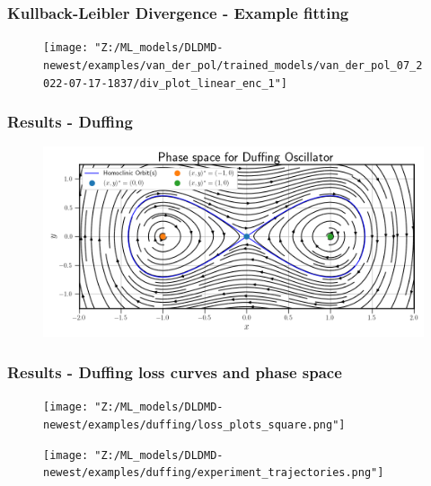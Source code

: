 \documentclass[11pt,aspectratio=169]{beamer}
\begin{document}
    \begin{frame}
        \frametitle{Kullback-Leibler Divergence - Example fitting}
        \begin{figure}
            \centering
            \texttt{[image: "Z:/ML\_models/DLDMD-newest/examples/van\_der\_pol/trained\_models/van\_der\_pol\_07\_2022-07-17-1837/div\_plot\_linear\_enc\_1"]}
        \end{figure}
    \end{frame}

    \begin{frame}
        \frametitle{Results - Duffing}
        \begin{figure}
            \centering
            \includegraphics[width=\textwidth]{../Figures/duffing_phase_space.png}
        \end{figure}
    \end{frame}

    \begin{frame}
        \frametitle{Results - Duffing loss curves and phase space}
        \begin{figure}
            \centering
            \begin{minipage}{.5\textwidth}
                \texttt{[image: "Z:/ML\_models/DLDMD-newest/examples/duffing/loss\_plots\_square.png"]}
            \end{minipage}%
            \begin{minipage}{.5\textwidth}
                \texttt{[image: "Z:/ML\_models/DLDMD-newest/examples/duffing/experiment\_trajectories.png"]}
            \end{minipage}
        \end{figure}
    \end{frame}
    
\end{document}
